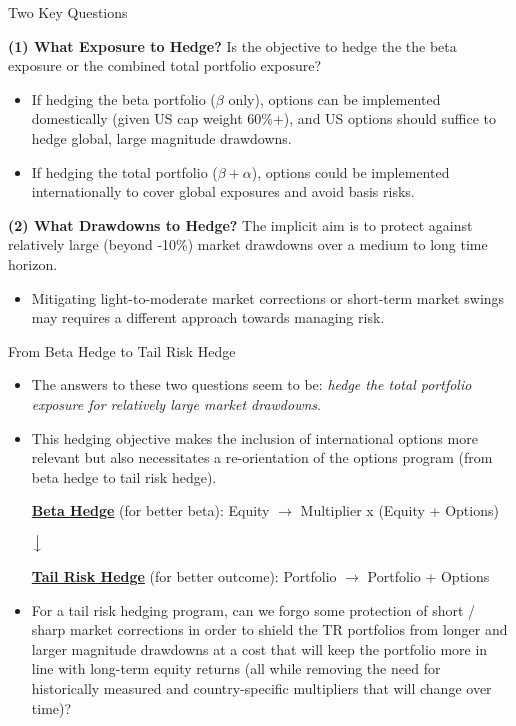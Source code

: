 \documentclass{beamer}
\begin{document}
\begin{frame}{Two Key Questions}
\begin{block}{\bf{(1) What Exposure to Hedge?}}
Is the objective to hedge the the beta exposure or the combined total portfolio exposure?
\begin{itemize}
	\item If hedging the beta portfolio ($\beta$ only), options can be implemented domestically (given US cap weight 60\%+), and US options should suffice to hedge global, large magnitude drawdowns.
	\item If hedging the total portfolio ($\beta+\alpha$), options could be implemented internationally to cover global exposures and avoid basis risks.
\end{itemize}
\end{block}

\begin{block}{\bf{(2) What Drawdowns to Hedge?}}
The implicit aim is to protect against relatively large (beyond -10\%) market drawdowns over a medium to long time horizon.
\begin{itemize} 
\item Mitigating light-to-moderate market corrections or short-term market swings may requires a different approach towards managing risk.
\end{itemize}
\end{block}

\end{frame}

\begin{frame}{From Beta Hedge to Tail Risk Hedge}
\begin{itemize}
\item The answers to these two questions seem to be: {\em hedge the total portfolio exposure for relatively large market drawdowns}.
\vfill
\item This hedging objective makes the inclusion of international options more relevant but also necessitates a re-orientation of the options program (from beta hedge to tail risk hedge).


\begin{block}

\centerline {\underline{\bf Beta Hedge} (for better beta): Equity $\rightarrow$ Multiplier x (Equity + Options)}
\centerline {\bf $\big\downarrow$}
\centerline {\underline{\bf Tail Risk Hedge} (for better outcome): Portfolio $\rightarrow$ Portfolio + Options}

\end{block}


\item For a tail risk hedging program, can we forgo some protection of short / sharp market corrections in order to shield the TR portfolios from longer and larger magnitude drawdowns at a cost that will keep the portfolio more in line with long-term equity returns (all while removing the need for historically measured and country-specific multipliers that will change over time)?
\end{itemize}

\end{frame}
\end{document}

